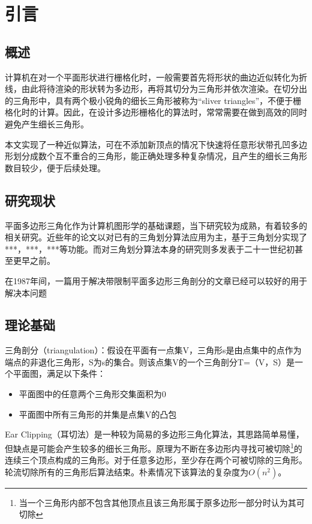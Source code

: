 
\chapter{引言}

\section{概述}
  计算机在对一个平面形状进行栅格化时，一般需要首先将形状的曲边近似转化为折线，由此将待渲染的形状转为多边形，再将其切分为三角形并依次渲染。在切分出的三角形中，具有两个极小锐角的细长三角形被称为“sliver triangles”，不便于栅格化时的计算。因此，在设计多边形栅格化的算法时，常常需要在做到高效的同时避免产生细长三角形。

  本文实现了一种近似算法，可在不添加新顶点的情况下快速将任意形状带孔凹多边形划分成数个互不重合的三角形，能正确处理多种复杂情况，且产生的细长三角形数目较少，便于后续处理。
\section{研究现状}

平面多边形三角化作为计算机图形学的基础课题，当下研究较为成熟，有着较多的相关研究。近些年的论文以对已有的三角划分算法应用为主，基于三角划分实现了***，***，***等功能。而对三角划分算法本身的研究则多发表于二十一世纪初甚至更早之前。

在1987年间，一篇用于解决带限制平面多边形三角剖分的文章已经可以较好的用于解决本问题

\section{理论基础}
三角剖分（triangulation）：假设在平面有一点集V，三角形s是由点集中的点作为端点的非退化三角形，S为s的集合。则该点集V的一个三角剖分T=（V，S）是一个平面图，满足以下条件：
\begin{itemize}
  \item 平面图中的任意两个三角形交集面积为0
  \item 平面图中所有三角形的并集是点集V的凸包
\end{itemize}

Ear Clipping（耳切法）是一种较为简易的多边形三角化算法，其思路简单易懂，但缺点是可能会产生较多的细长三角形。原理为不断在多边形内寻找可被切除\footnote[1]{当一个三角形内部不包含其他顶点且该三角形属于原多边形一部分时认为其可切除}的连续三个顶点构成的三角形。对于任意多边形，至少存在两个可被切除的三角形。轮流切除所有的三角形后算法结束。朴素情况下该算法的复杂度为\(O(n^2)\)。


